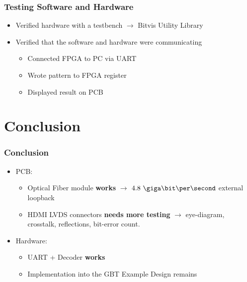 \documentclass[aspectratio=43]{beamer}
\begin{document}
{\begin{frame}[t]
\end{frame}

\begin{frame}[t]
\frametitle{Testing Software and Hardware}

\begin{itemize}
\item Verified hardware with a testbench $\rightarrow$ Bitvis Utility Library
\item Verified that the software and hardware were communicating
	\begin{itemize}
	\item Connected FPGA to PC via UART
	\item Wrote pattern to FPGA register
	\item Displayed result on PCB
	\end{itemize}
\end{itemize}

\end{frame}

\section{Conclusion}

\begin{frame}[t]
\frametitle{Conclusion}

\begin{itemize}
\item PCB:
	\begin{itemize}
	\item Optical Fiber module \textbf{works} $\rightarrow$ $4.8~\giga\bit\per\second$ external loopback
	\item HDMI LVDS connectors \textbf{needs more testing} $\rightarrow$ eye-diagram, crosstalk, reflections, bit-error count.
	\end{itemize}
\end{itemize}

\begin{itemize}
\item Hardware:
	\begin{itemize}
	\item UART + Decoder \textbf{works}
	\item Implementation into the GBT Example Design remains
	\end{itemize}
\end{itemize}	


\end{frame}}
\end{document}

